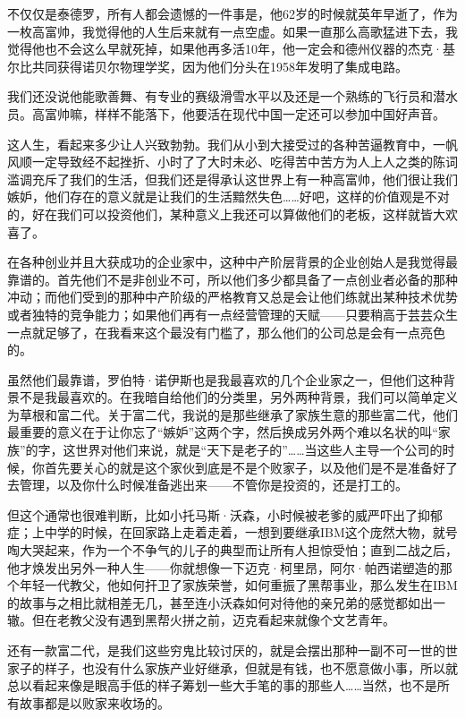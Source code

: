 不仅仅是泰德罗，所有人都会遗憾的一件事是，他62岁的时候就英年早逝了，作为一枚高富帅，我觉得他的人生后来就有一点空虚。如果一直那么高歌猛进下去，我觉得他也不会这么早就死掉，如果他再多活10年，他一定会和德州仪器的杰克·基尔比共同获得诺贝尔物理学奖，因为他们分头在1958年发明了集成电路。

我们还没说他能歌善舞、有专业的赛级滑雪水平以及还是一个熟练的飞行员和潜水员。高富帅嘛，样样不能落下，他要活在现代中国一定还可以参加中国好声音。

这人生，看起来多少让人兴致勃勃。我们从小到大接受过的各种苦逼教育中，一帆风顺一定导致经不起挫折、小时了了大时未必、吃得苦中苦方为人上人之类的陈词滥调充斥了我们的生活，但我们还是得承认这世界上有一种高富帅，他们很让我们嫉妒，他们存在的意义就是让我们的生活黯然失色\ldots\ldots 好吧，这样的价值观是不对的，好在我们可以投资他们，某种意义上我还可以算做他们的老板，这样就皆大欢喜了。

在各种创业并且大获成功的企业家中，这种中产阶层背景的企业创始人是我觉得最靠谱的。首先他们不是非创业不可，所以他们多少都具备了一点创业者必备的那种冲动；而他们受到的那种中产阶级的严格教育又总是会让他们练就出某种技术优势或者独特的竞争能力；如果他们再有一点经营管理的天赋------只要稍高于芸芸众生一点就足够了，在我看来这个最没有门槛了，那么他们的公司总是会有一点亮色的。

虽然他们最靠谱，罗伯特·诺伊斯也是我最喜欢的几个企业家之一，但他们这种背景不是我最喜欢的。在我暗自给他们的分类里，另外两种背景，我们可以简单定义为草根和富二代。关于富二代，我说的是那些继承了家族生意的那些富二代，他们最重要的意义在于让你忘了``嫉妒''这两个字，然后换成另外两个难以名状的叫``家族''的字，这世界对他们来说，就是``天下是老子的''\ldots\ldots 当这些人主导一个公司的时候，你首先要关心的就是这个家伙到底是不是个败家子，以及他们是不是准备好了去管理，以及你什么时候准备逃出来------不管你是投资的，还是打工的。

但这个通常也很难判断，比如小托马斯·沃森，小时候被老爹的威严吓出了抑郁症；上中学的时候，在回家路上走着走着，一想到要继承IBM这个庞然大物，就号啕大哭起来，作为一个不争气的儿子的典型而让所有人担惊受怕；直到二战之后，他才焕发出另外一种人生------你就想像一下迈克·柯里昂，阿尔·帕西诺塑造的那个年轻一代教父，他如何扞卫了家族荣誉，如何重振了黑帮事业，那么发生在IBM的故事与之相比就相差无几，甚至连小沃森如何对待他的亲兄弟的感觉都如出一辙。但在老教父没有遇到黑帮火拼之前，迈克看起来就像个文艺青年。

还有一款富二代，是我们这些穷鬼比较讨厌的，就是会摆出那种一副不可一世的世家子的样子，也没有什么家族产业好继承，但就是有钱，也不愿意做小事，所以就总以看起来像是眼高手低的样子筹划一些大手笔的事的那些人\ldots\ldots 当然，也不是所有故事都是以败家来收场的。

